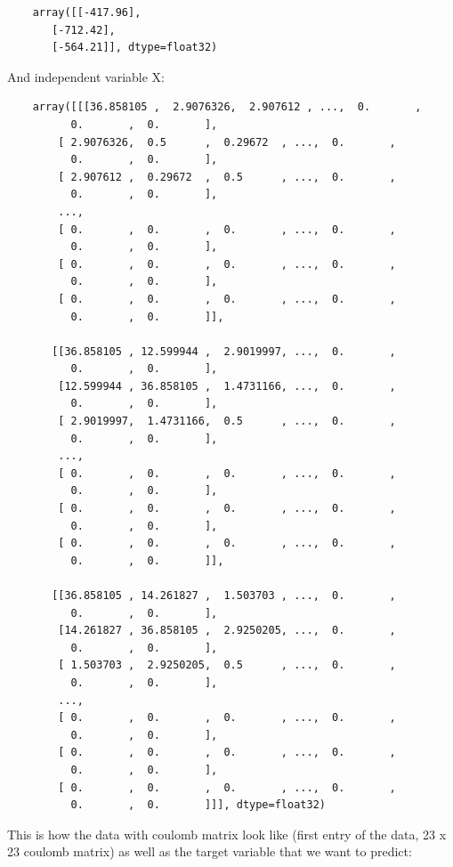 \documentclass[a4paper,oneside,openright,11pt]{book}
\begin{document}
\begin{verbatim}
    array([[-417.96],
       [-712.42],
       [-564.21]], dtype=float32)
\end{verbatim}

And independent variable X:

\begin{verbatim}
    array([[[36.858105 ,  2.9076326,  2.907612 , ...,  0.       ,
          0.       ,  0.       ],
        [ 2.9076326,  0.5      ,  0.29672  , ...,  0.       ,
          0.       ,  0.       ],
        [ 2.907612 ,  0.29672  ,  0.5      , ...,  0.       ,
          0.       ,  0.       ],
        ...,
        [ 0.       ,  0.       ,  0.       , ...,  0.       ,
          0.       ,  0.       ],
        [ 0.       ,  0.       ,  0.       , ...,  0.       ,
          0.       ,  0.       ],
        [ 0.       ,  0.       ,  0.       , ...,  0.       ,
          0.       ,  0.       ]],

       [[36.858105 , 12.599944 ,  2.9019997, ...,  0.       ,
          0.       ,  0.       ],
        [12.599944 , 36.858105 ,  1.4731166, ...,  0.       ,
          0.       ,  0.       ],
        [ 2.9019997,  1.4731166,  0.5      , ...,  0.       ,
          0.       ,  0.       ],
        ...,
        [ 0.       ,  0.       ,  0.       , ...,  0.       ,
          0.       ,  0.       ],
        [ 0.       ,  0.       ,  0.       , ...,  0.       ,
          0.       ,  0.       ],
        [ 0.       ,  0.       ,  0.       , ...,  0.       ,
          0.       ,  0.       ]],

       [[36.858105 , 14.261827 ,  1.503703 , ...,  0.       ,
          0.       ,  0.       ],
        [14.261827 , 36.858105 ,  2.9250205, ...,  0.       ,
          0.       ,  0.       ],
        [ 1.503703 ,  2.9250205,  0.5      , ...,  0.       ,
          0.       ,  0.       ],
        ...,
        [ 0.       ,  0.       ,  0.       , ...,  0.       ,
          0.       ,  0.       ],
        [ 0.       ,  0.       ,  0.       , ...,  0.       ,
          0.       ,  0.       ],
        [ 0.       ,  0.       ,  0.       , ...,  0.       ,
          0.       ,  0.       ]]], dtype=float32)
\end{verbatim}


This is how the data with coulomb matrix look like (first entry of the data, 23 x 23 coulomb matrix) as well as the target variable that we want to predict:
\end{document}
